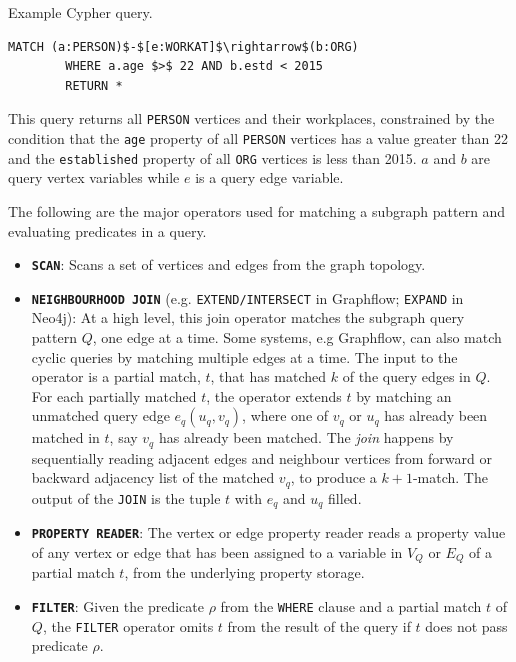 \begin{example}
	\vspace{5pt}
	\label{ex:cypher-example}
	Example Cypher query. 
	{\em 
		\begin{lstlisting}[numbers=none,  showstringspaces=false,belowskip=0pt ]
		MATCH (a:PERSON)$-$[e:WORKAT]$\rightarrow$(b:ORG)
		WHERE a.age $>$ 22 AND b.estd < 2015
		RETURN *\end{lstlisting}
	}
	\noindent This query returns all \texttt{PERSON} vertices and their workplaces, constrained by the condition that the \textsc{}\texttt{age}\textsc{} property of all \texttt{PERSON} vertices has a value greater than 22 and the \textsc{}\texttt{established}\textsc{} property of all \texttt{ORG} vertices is less than 2015. $a$ and $b$ are query vertex variables while $e$ is a query edge variable.
\end{example}

The following are the major operators used for matching a subgraph pattern and evaluating predicates in a query.

\begin{itemize}
	
	\item \textbf{\texttt{SCAN}}: Scans a set of vertices and edges from the graph topology.
	
	\item \textbf{\texttt{NEIGHBOURHOOD JOIN}} (e.g. \texttt{EXTEND/INTERSECT} in Graphflow; \texttt{EXPAND} in Neo4j): At a high level, this join operator matches the subgraph query pattern $Q$, one edge at a time. Some systems, e.g Graphflow, can also match cyclic queries by matching multiple edges at a time. The input to the operator is a partial match, $t$, that has matched $k$ of the query edges in $Q$. For each partially matched $t$, the operator extends $t$ by matching an unmatched query edge $e_q(u_q, v_q)$, where one of $v_q$ or $u_q$ has already been matched in $t$, say $v_q$ has already been matched. The \emph{join} happens by sequentially reading adjacent edges and neighbour vertices from forward or backward adjacency list of the matched $v_q$, to produce a $k+1$-match. The output of the \texttt{JOIN} is the tuple $t$ with $e_q$ and $u_q$ filled.
	
	\item \textbf{\texttt{PROPERTY READER}}: The vertex or edge property reader reads a property value of any vertex or edge that has been assigned to a variable in $V_Q$ or $E_Q$ of a partial match $t$, from the underlying property storage. 
	
	\item \textbf{\texttt{FILTER}}: Given the predicate $\rho$ from the \texttt{WHERE} clause and a partial match $t$ of $Q$, the \texttt{FILTER} operator omits $t$ from the result of the query if $t$ does not pass predicate $\rho$.
	
\end{itemize}

